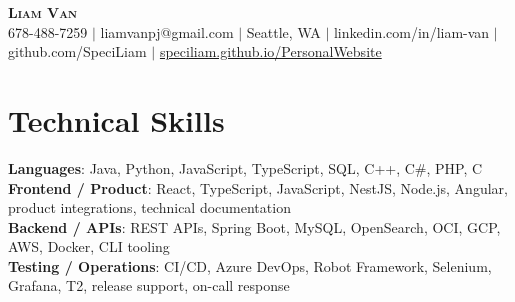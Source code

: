 \documentclass[letterpaper,11pt]{article}
\begin{document}

%
\begin{center}
    \textbf{\Huge \scshape Liam Van} \\ \vspace{1pt}
    \small 678-488-7259 $|$ \small {liamvanpj@gmail.com} $|$ Seattle, WA
 {{$|$ linkedin.com/in/liam-van} {$|$ github.com/SpeciLiam} {$|$ \href{https://speciliam.github.io/PersonalWebsite}{speciliam.github.io/PersonalWebsite}}}

\end{center}

\section{Technical Skills}
 \begin{itemize}[leftmargin=0.15in, label={}]
    \small{\item{
     \textbf{Languages}{: Java, Python, JavaScript, TypeScript, SQL, C++, C\#, PHP, C} \\
     \textbf{Frontend / Product}{: React, TypeScript, JavaScript, NestJS, Node.js, Angular, product integrations, technical documentation} \\
     \textbf{Backend / APIs}{: REST APIs, Spring Boot, MySQL, OpenSearch, OCI, GCP, AWS, Docker, CLI tooling} \\
     \textbf{Testing / Operations}{: CI/CD, Azure DevOps, Robot Framework, Selenium, Grafana, T2, release support, on-call response} \\
    }}
 \end{itemize}
%
\end{document}
